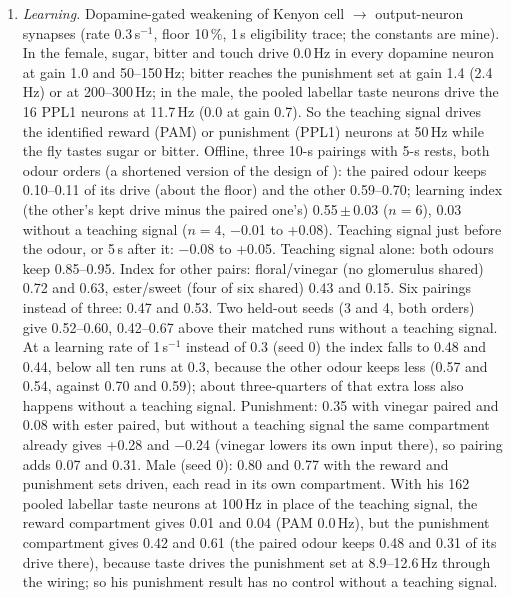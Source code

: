 \documentclass[11pt,a4paper]{article}
\begin{document}
\begin{enumerate}[leftmargin=*, label=\arabic*., itemsep=4pt]
Touch $\rightarrow$ DNp13 is 36.0\,$\pm$\,0.8\,Hz without a state and 36.1\,$\pm$\,0.7 with SAG. At gain 1.4 SAG lowers it from 41.9 to 37.9\,Hz (5 seeds; $p=0.04$). With the state neurons driven at 100\,Hz, SAG lowers it from 35.6\,$\pm$\,1.0 to 32.3\,$\pm$\,1.4\,Hz (5 seeds; Welch $p=0.004$, which meets the rule set in advance for qualifying this miss) and pC1a--c to 28.3\,$\pm$\,1.4\,Hz ($p=2\times10^{-5}$), while no other state lowers it by more than 0.9\,Hz. At 10--60\,Hz neither moves touch alone by more than 1.5\,Hz ($p\geq0.12$); with cVA added, at 60\,Hz, they lower it by 2.2 and 4.2\,Hz ($p=0.04$ and 0.05). oviDN is 0 under every state, at every gain and state rate.

\item \emph{Learning.} Dopamine-gated weakening of Kenyon cell $\rightarrow$ output-neuron synapses (rate 0.3\,s$^{-1}$, floor 10\,\%, 1\,s eligibility trace; the constants are mine). In the female, sugar, bitter and touch drive 0.0\,Hz in every dopamine neuron at gain 1.0 and 50--150\,Hz; bitter reaches the punishment set at gain 1.4 (2.4\,Hz) or at 200--300\,Hz; in the male, the pooled labellar taste neurons drive the 16 PPL1 neurons at 11.7\,Hz (0.0 at gain 0.7). So the teaching signal drives the identified reward (PAM) or punishment (PPL1) neurons at 50\,Hz while the fly tastes sugar or bitter. Offline, three 10-s pairings with 5-s rests, both odour orders (a shortened version of the design of \citealt{tully1985classical}): the paired odour keeps 0.10--0.11 of its drive (about the floor) and the other 0.59--0.70; learning index (the other's kept drive minus the paired one's) 0.55\,$\pm$\,0.03 ($n=6$), 0.03 without a teaching signal ($n=4$, $-$0.01 to +0.08). Teaching signal just before the odour, or 5\,s after it: $-$0.08 to +0.05. Teaching signal alone: both odours keep 0.85--0.95. Index for other pairs: floral/vinegar (no glomerulus shared) 0.72 and 0.63, ester/sweet (four of six shared) 0.43 and 0.15. Six pairings instead of three: 0.47 and 0.53. Two held-out seeds (3 and 4, both orders) give 0.52--0.60, 0.42--0.67 above their matched runs without a teaching signal. At a learning rate of 1\,s$^{-1}$ instead of 0.3 (seed 0) the index falls to 0.48 and 0.44, below all ten runs at 0.3, because the other odour keeps less (0.57 and 0.54, against 0.70 and 0.59); about three-quarters of that extra loss also happens without a teaching signal.
Punishment: 0.35 with vinegar paired and 0.08 with ester paired, but without a teaching signal the same compartment already gives +0.28 and $-$0.24 (vinegar lowers its own input there), so pairing adds 0.07 and 0.31. Male (seed 0): 0.80 and 0.77 with the reward and punishment sets driven, each read in its own compartment. With his 162 pooled labellar taste neurons at 100\,Hz in place of the teaching signal, the reward compartment gives 0.01 and 0.04 (PAM 0.0\,Hz), but the punishment compartment gives 0.42 and 0.61 (the paired odour keeps 0.48 and 0.31 of its drive there), because taste drives the punishment set at 8.9--12.6\,Hz through the wiring; so his punishment result has no control without a teaching signal.

\end{enumerate}
\end{document}
